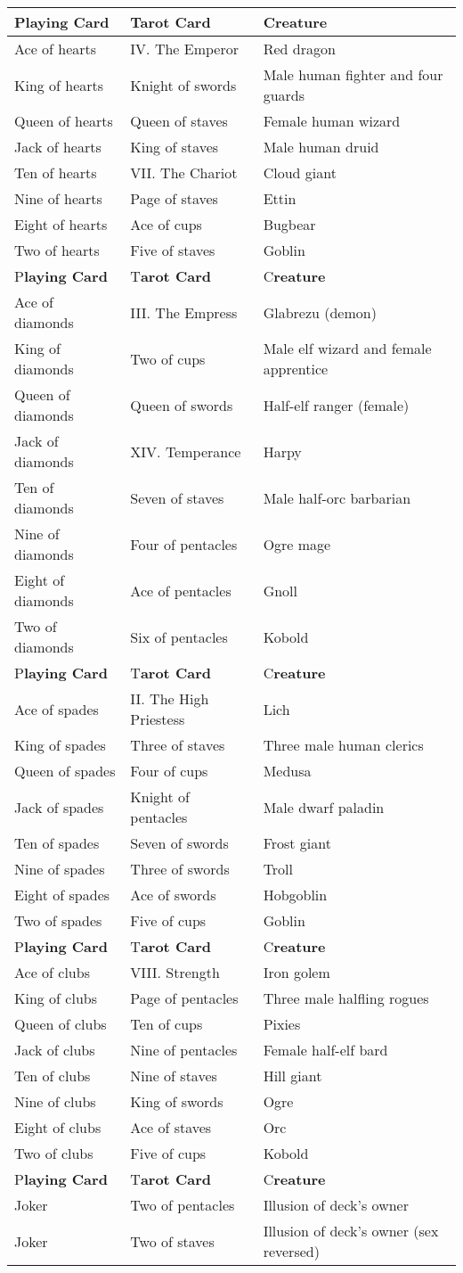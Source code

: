 \documentclass{article}
\begin{document}
\begin{tabular}{|>{\raggedright}p{77pt}|>{\raggedright}p{85pt}|>{\raggedright}p{150pt}|}
\hline
P\textbf{laying Card} & T\textbf{arot Card} & C\textbf{reature}\tabularnewline
\hline
Ace of hearts & IV. The Emperor & Red dragon\tabularnewline
\hline
King of hearts & Knight of swords & Male human fighter and four guards\tabularnewline
\hline
Queen of hearts & Queen of staves & Female human wizard\tabularnewline
\hline
Jack of hearts & King of staves & Male human druid\tabularnewline
\hline
Ten of hearts & VII. The Chariot & Cloud giant\tabularnewline
\hline
Nine of hearts & Page of staves & Ettin\tabularnewline
\hline
Eight of hearts & Ace of cups & Bugbear\tabularnewline
\hline
Two of hearts & Five of staves & Goblin\tabularnewline
\hline
P\textbf{laying Card} & T\textbf{arot Card} & C\textbf{reature}\tabularnewline
\hline
Ace of diamonds & III. The Empress & Glabrezu (demon)\tabularnewline
\hline
King of diamonds & Two of cups & Male elf wizard and female apprentice\tabularnewline
\hline
Queen of diamonds & Queen of swords & Half-elf ranger (female)\tabularnewline
\hline
Jack of diamonds & XIV. Temperance & Harpy\tabularnewline
\hline
Ten of diamonds & Seven of staves & Male half-orc barbarian\tabularnewline
\hline
Nine of diamonds & Four of pentacles & Ogre mage\tabularnewline
\hline
Eight of diamonds & Ace of pentacles & Gnoll\tabularnewline
\hline
Two of diamonds & Six of pentacles & Kobold\tabularnewline
\hline
P\textbf{laying Card} & T\textbf{arot Card} & C\textbf{reature}\tabularnewline
\hline
Ace of spades & II. The High Priestess & Lich\tabularnewline
\hline
King of spades & Three of staves & Three male human clerics\tabularnewline
\hline
Queen of spades & Four of cups & Medusa\tabularnewline
\hline
Jack of spades & Knight of pentacles & Male dwarf paladin\tabularnewline
\hline
Ten of spades & Seven of swords & Frost giant\tabularnewline
\hline
Nine of spades & Three of swords & Troll\tabularnewline
\hline
Eight of spades & Ace of swords & Hobgoblin\tabularnewline
\hline
Two of spades & Five of cups & Goblin\tabularnewline
\hline
P\textbf{laying Card} & T\textbf{arot Card} & C\textbf{reature}\tabularnewline
\hline
Ace of clubs & VIII. Strength & Iron golem\tabularnewline
\hline
King of clubs & Page of pentacles & Three male halfling rogues\tabularnewline
\hline
Queen of clubs & Ten of cups & Pixies\tabularnewline
\hline
Jack of clubs & Nine of pentacles & Female half-elf bard\tabularnewline
\hline
Ten of clubs & Nine of staves & Hill giant\tabularnewline
\hline
Nine of clubs & King of swords & Ogre\tabularnewline
\hline
Eight of clubs & Ace of staves & Orc\tabularnewline
\hline
Two of clubs & Five of cups & Kobold\tabularnewline
\hline
P\textbf{laying Card} & T\textbf{arot Card} & C\textbf{reature}\tabularnewline
\hline
Joker & Two of pentacles & Illusion of deck's owner\tabularnewline
\hline
Joker & Two of staves & Illusion of deck's owner (sex reversed)\tabularnewline
\hline
\end{tabular}
\end{document}
